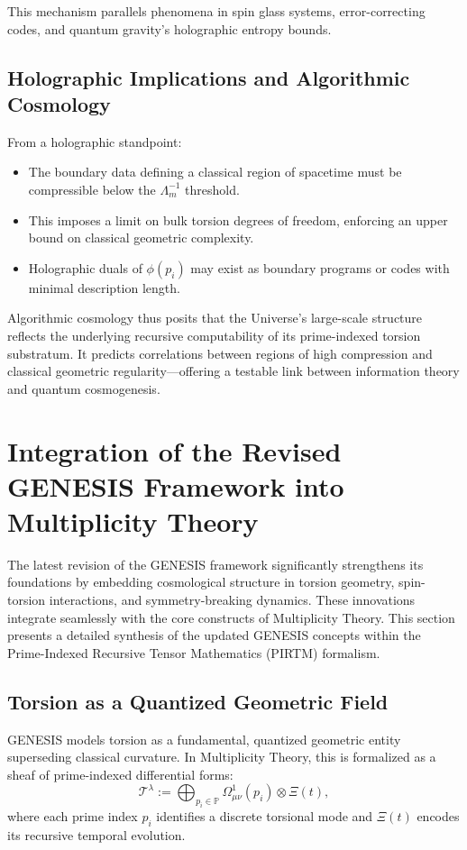 \documentclass{article}
\theoremstyle{plain}
\begin{document}
This mechanism parallels phenomena in spin glass systems, error-correcting codes, and quantum gravity's holographic entropy bounds.

\subsection{Holographic Implications and Algorithmic Cosmology}

From a holographic standpoint:
\begin{itemize}
    \item The boundary data defining a classical region of spacetime must be compressible below the $\Lambda_m^{-1}$ threshold.
    \item This imposes a limit on bulk torsion degrees of freedom, enforcing an upper bound on classical geometric complexity.
    \item Holographic duals of $\phi(p_i)$ may exist as boundary programs or codes with minimal description length.
\end{itemize}

Algorithmic cosmology thus posits that the Universe's large-scale structure reflects the underlying recursive computability of its prime-indexed torsion substratum. It predicts correlations between regions of high compression and classical geometric regularity—offering a testable link between information theory and quantum cosmogenesis.

\section{Integration of the Revised GENESIS Framework into Multiplicity Theory}

The latest revision of the GENESIS framework significantly strengthens its foundations by embedding cosmological structure in torsion geometry, spin-torsion interactions, and symmetry-breaking dynamics. These innovations integrate seamlessly with the core constructs of Multiplicity Theory. This section presents a detailed synthesis of the updated GENESIS concepts within the Prime-Indexed Recursive Tensor Mathematics (PIRTM) formalism.

\subsection{Torsion as a Quantized Geometric Field}
GENESIS models torsion as a fundamental, quantized geometric entity superseding classical curvature. In Multiplicity Theory, this is formalized as a sheaf of prime-indexed differential forms:
\[
\mathcal{T}^\lambda := \bigoplus_{p_i \in \mathbb{P}} \Omega^1_{\mu\nu}(p_i) \otimes \Xi(t),
\]
where each prime index \( p_i \) identifies a discrete torsional mode and \( \Xi(t) \) encodes its recursive temporal evolution.
\end{document}
